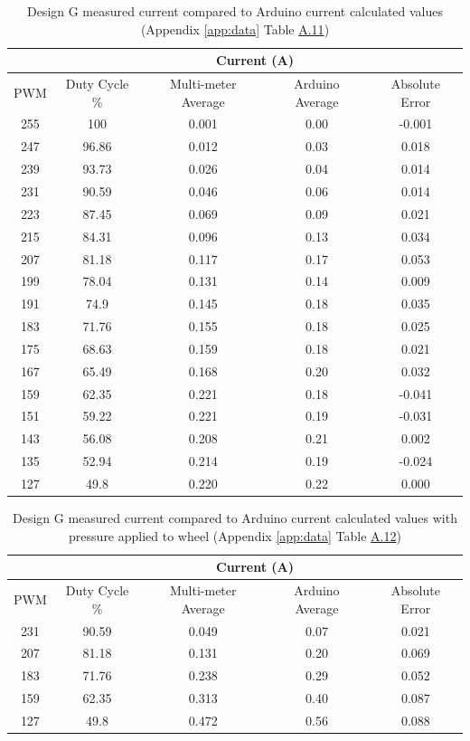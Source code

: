 \begin{table}[H]
    \centering
    \caption[Design G: Current Measurements]{Design G measured current compared to Arduino current calculated values (Appendix \ref{app:data} Table \hyperref[tab:A.11]{A.11})}
    \label{tab:High_current}
    \begin{tabular}{|c|c||c|c||c|}\hline
     &&\multicolumn{2}{|c||}{Current (A)} &  \\\hline
    PWM &Duty Cycle \%&Multi-meter Average&Arduino Average&Absolute Error \\ \hline 
    255 &100&0.001&0.00&-0.001\\ \hline
    247 &96.86&0.012&0.03&0.018\\\hline
    239 &93.73&0.026&0.04&0.014\\\hline
    231 &90.59&0.046&0.06&0.014\\\hline
    223 &87.45&0.069&0.09&0.021\\\hline
    215 &84.31&0.096&0.13&0.034\\\hline
    207 &81.18& 0.117& 0.17& 0.053\\\hline
    199 &78.04& 0.131& 0.14& 0.009\\\hline
    191 &74.9& 0.145& 0.18& 0.035\\\hline
    183 &71.76& 0.155& 0.18& 0.025\\\hline
    175 &68.63& 0.159& 0.18& 0.021\\\hline
    167 &65.49& 0.168& 0.20& 0.032\\\hline
    159 &62.35& 0.221& 0.18& -0.041\\\hline
    151 &59.22& 0.221& 0.19& -0.031\\\hline
    143 &56.08& 0.208& 0.21& 0.002\\\hline
    135 &52.94& 0.214& 0.19& -0.024\\\hline
    127 &49.8& 0.220& 0.22& 0.000\\\hline\end{tabular}  
\end{table}

\begin{table}[H]
    \centering
    \caption[Design G: Current Measurements]{Design G measured current compared to Arduino current calculated values with pressure applied to wheel (Appendix \ref{app:data} Table \hyperref[tab:A.12]{A.12})}
    \label{tab:High_current_pressure}
    \begin{tabular}{|c|c||c|c||c|}\hline
     &&\multicolumn{2}{|c||}{Current (A)} &  \\\hline
    PWM &Duty Cycle \%&Multi-meter Average&Arduino Average&Absolute Error \\ \hline 
    231 &90.59&0.049&0.07&0.021\\ \hline
    207 &81.18&0.131&0.20&0.069\\\hline
    183 &71.76&0.238&0.29&0.052\\\hline
    159 &62.35&0.313&0.40&0.087\\\hline
    127 &49.8&0.472&0.56&0.088\\\hline\end{tabular}  
\end{table}

